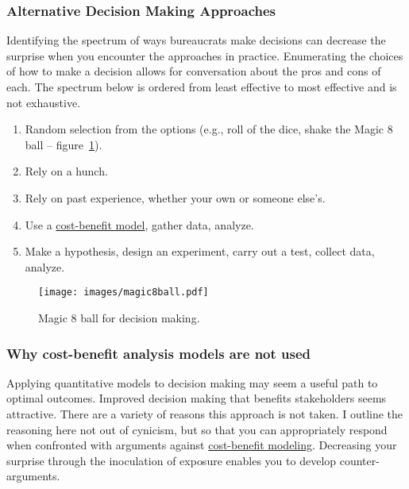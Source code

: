 \subsubsection{Alternative Decision Making Approaches}
Identifying the spectrum of ways bureaucrats make decisions can decrease the surprise when you encounter the approaches in practice. 
Enumerating the choices of how to make a decision allows for conversation about the pros and cons of each. The spectrum below is ordered from least effective to most effective and is not exhaustive.
\begin{enumerate}
    \item Random selection from the options (e.g., roll of the dice, shake the Magic 8 ball -- figure~\ref{fig:magic8ball}).
    \item Rely on a hunch.
    \item Rely on past experience, whether your own or someone else's.
    \item Use a \href{https://en.wikipedia.org/wiki/Cost\%E2\%80\%93benefit_analysis}{cost-benefit model}, gather data, analyze.
    \item Make a hypothesis, design an experiment, carry out a test, collect data, analyze.
\end{enumerate}

\begin{figure}
    \centering
    \texttt{[image: images/magic8ball.pdf]}
    \caption{Magic 8 ball for decision making.}
    \label{fig:magic8ball}
\end{figure}

\subsubsection{Why cost-benefit analysis models are not used}

Applying quantitative models to decision making may seem a useful path to optimal outcomes. Improved decision making that benefits stakeholders seems attractive. There are a variety of reasons this approach is not taken. I outline the reasoning here not out of cynicism, but so that you can appropriately respond when confronted with arguments against \href{https://en.wikipedia.org/wiki/Cost\%E2\%80\%93benefit_analysis}{cost-benefit modeling}.
Decreasing your surprise through the inoculation of exposure enables you to develop counter-arguments. 

